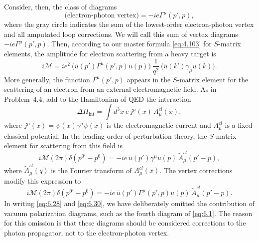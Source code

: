 Consider, then, the class of diagrams
\begin{equation}
  \text{(electron-photon vertex)} = -ie\Gamma^\mu(p', p),
\end{equation}
where the gray circle indicates the sum of the lowest-order electron-photon
vertex and all amputated loop corrections.  We will call this sum of vertex
diagrams $-ie\Gamma^\mu(p',p)$.  Then, according to our master formula
\eqref{eq:4.103} for $S$-matrix elements, the amplitude for electron scattering
from a heavy target is
\begin{equation}
  i\mathcal{M} = ie^2\ \bigl( \bar{u}(p')\Gamma^\mu(p',p)u(p) \bigr)\
    \frac{1}{q^2}\ \bigl( \bar{u}(k')\gamma_\mu u(k) \bigr).
  \label{eq:6.28}
\end{equation}
More generally, the function $\Gamma^\mu(p',p)$ appears in the $S$-matrix
element for the scattering of an electron from an external electromagnetic
field.  As in Problem~4.4, add to the Hamiltonian of QED the interaction
\begin{equation}
  \Delta H_{\mathrm{int}} = \int d^3x\ e\,j^\mu(x)\,A^{cl}_\mu(x),
  \label{eq:6.29}
\end{equation}
where $j^\mu(x) = \bar{\psi}(x)\gamma^\mu\psi(x)$ is the electromagnetic
current and $A^{cl}_\mu$ is a fixed classical potential.  In the leading order
of perturbation theory, the $S$-matrix element for scattering from this field
is
\begin{equation}
  i\mathcal{M}(2\pi)\delta(p^{0'}-p^0) = -ie\,\bar{u}(p')\gamma^\mu u(p)\,
    \tilde{A}^{cl}_\mu(p'-p),
\end{equation}
where $\tilde{A}^{cl}_\mu(q)$ is the Fourier transform of $A^{cl}_\mu(x)$.
The vertex corrections modify this expression to
\begin{equation}
  i\mathcal{M}(2\pi)\delta(p^{0'}-p^0) = -ie\,\bar{u}(p')\Gamma^\mu(p',p)u(p)\,
    \tilde{A}^{cl}_\mu(p'-p) .
  \label{eq:6.30}
\end{equation}
In writing \eqref{eq:6.28} and \eqref{eq:6.30}, we have deliberately omitted
the contribution of vacuum polarization diagrams, such as the fourth diagram
of \eqref{eq:6.1}.  The reason for this omission is that these diagrams should
be considered corrections to the photon propagator, not to the electron-photon
vertex.

